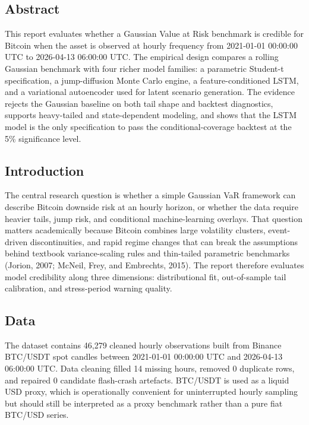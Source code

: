 \setlength{\LTleft}{\fill}
\setlength{\LTright}{\fill}
\renewcommand{\arraystretch}{1.05}

\subsection{Abstract}

This report evaluates whether a Gaussian Value at Risk benchmark is credible for Bitcoin when the asset is observed at hourly frequency from 2021-01-01 00:00:00 UTC to 2026-04-13 06:00:00 UTC. The empirical design compares a rolling Gaussian benchmark with four richer model families: a parametric Student-t specification, a jump-diffusion Monte Carlo engine, a feature-conditioned LSTM, and a variational autoencoder used for latent scenario generation. The evidence rejects the Gaussian baseline on both tail shape and backtest diagnostics, supports heavy-tailed and state-dependent modeling, and shows that the LSTM model is the only specification to pass the conditional-coverage backtest at the 5\% significance level.

\subsection{Introduction}

The central research question is whether a simple Gaussian VaR framework can describe Bitcoin downside risk at an hourly horizon, or whether the data require heavier tails, jump risk, and conditional machine-learning overlays. That question matters academically because Bitcoin combines large volatility clusters, event-driven discontinuities, and rapid regime changes that can break the assumptions behind textbook variance-scaling rules and thin-tailed parametric benchmarks (Jorion, 2007; McNeil, Frey, and Embrechts, 2015). The report therefore evaluates model credibility along three dimensions: distributional fit, out-of-sample tail calibration, and stress-period warning quality.

\subsection{Data}

The dataset contains 46,279 cleaned hourly observations built from Binance BTC/USDT spot candles between 2021-01-01 00:00:00 UTC and 2026-04-13 06:00:00 UTC. Data cleaning filled 14 missing hours, removed 0 duplicate rows, and repaired 0 candidate flash-crash artefacts. BTC/USDT is used as a liquid USD proxy, which is operationally convenient for uninterrupted hourly sampling but should still be interpreted as a proxy benchmark rather than a pure fiat BTC/USD series.

